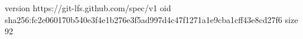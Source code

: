 version https://git-lfs.github.com/spec/v1
oid sha256:fc2e060170b540e3f4e1b276e3f5ad997d4c47f1271a1e9cba1cff43e8cd27f6
size 92
